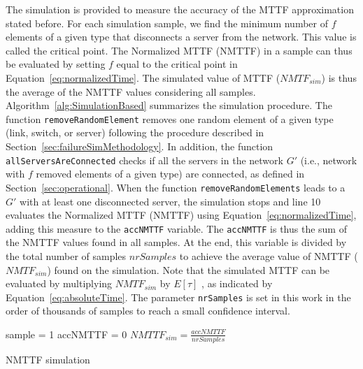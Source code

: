 The simulation is provided to measure the accuracy of the MTTF approximation stated before.
For each simulation sample, we find the minimum number of $f$ elements of a given type that disconnects a server from the network. This value is called the critical point.
The Normalized MTTF (NMTTF) in a sample can thus be evaluated by setting $f$ equal to the critical point in Equation~\ref{eq:normalizedTime}. The simulated value of MTTF ($NMTF_{sim}$) is thus the
average of the NMTTF values considering all samples. Algorithm~\ref{alg:SimulationBased} summarizes the simulation procedure.
The function \texttt{removeRandomElement} removes one random element of a given type (link, switch, or server) following the procedure described in Section~\ref{sec:failureSimMethodology}.
In addition, the function \texttt{allServersAreConnected} checks if all the servers in the network $G'$ (i.e., network with $f$ removed elements of a given type) are connected, as defined in Section~\ref{sec:operational}.
When the function \texttt{removeRandomElements} leads to a $G'$ with at least one disconnected server, the simulation stops and line 10 evaluates the Normalized MTTF (NMTTF) using Equation~\ref{eq:normalizedTime}, adding this measure to the \texttt{accNMTTF} variable. The \texttt{accNMTTF} is thus the sum of the NMTTF values found in all samples. At the end, this variable is divided by the total number of samples $nrSamples$ to achieve the average value of NMTTF ($NMTF_{sim}$) found on the simulation. Note that the simulated MTTF can be evaluated by multiplying $NMTF_{sim}$ by ${E[\tau]}$ , as indicated by Equation~\ref{eq:absoluteTime}.
The parameter \texttt{nrSamples} is set in this work in the order of thousands of samples to reach a small confidence interval.
\begin{algorithm}
\footnotesize
\SetAlgoLined
{}
sample = 1\;
accNMTTF = 0\;
$NMTTF_{sim} = \frac{accNMTTF}{nrSamples}$\;
\caption{NMTTF simulation}
\label{alg:SimulationBased}
\end{algorithm}



